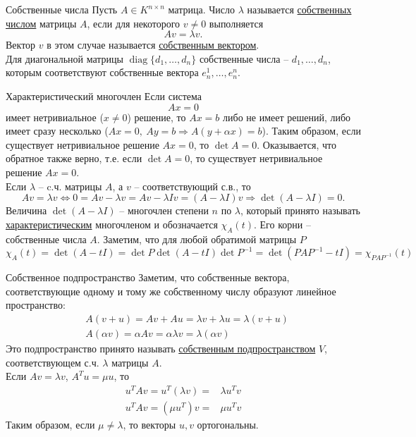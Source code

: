 \documentclass[10pt, handout]{beamer}
\DeclareMathOperator{\diag}{diag}
\begin{document}
\begin{frame}{Собственные числа}
Пусть $A\in K^{n\times n}$ матрица. Число $\lambda$ называется \underline{собственных числом} матрицы $A$, если для некоторого $v\neq 0$ выполняется
$$
Av=\lambda v.
$$
Вектор $v$ в этом случае называется \underline{собственным вектором}.\\
\vspace{1em}
\pause
Для диагональной матрицы $\diag\{d_1,\ldots, d_n\}$ собственные числа -- $d_1,\ldots, d_n$, которым соответствуют собственные вектора $e_n^1, \ldots, e_n^n$.
\end{frame}

\begin{frame}{Характеристический многочлен}
Если система
$$
Ax=0
$$
имеет нетривиальное ($x\neq 0$) решение, то $Ax=b$ либо не имеет решений, либо имеет сразу несколько ($Ax=0,~Ay=b\Rightarrow A(y+\alpha x)=b$). Таким образом, если существует нетривиальное решение $Ax=0$, то $\det A=0$. Оказывается, что обратное также верно, т.е. если $\det A=0$, то существует нетривиальное решение $Ax=0$.\\
\pause
\vspace{1em}
Если $\lambda$ -- c.ч. матрицы $A$, а $v$ -- соответствующий с.в., то
$$
Av=\lambda v\Leftrightarrow 0=Av-\lambda v=Av-\lambda Iv=(A-\lambda I)v\Rightarrow \det (A-\lambda I)=0.
$$
Величина $\det (A-\lambda I)$ -- многочлен степени $n$ по $\lambda$, который принято называть \underline{характеристическим} многочленом и обозначается $\chi_A(t)$. Его корни -- собственные числа $A$. Заметим, что для любой обратимой матрицы $P$
$$
\chi_A(t)=\det(A-tI)=\det P \det(A-tI) \det P^{-1}=
\det(PAP^{-1}-tI)=\chi_{PAP^{-1}}(t)
$$
\end{frame}

\begin{frame}{Собственное подпространство}
Заметим, что собственные вектора, соответствующие одному и тому же собственному числу образуют линейное пространство:
\begin{align*}
&A(v+u)=Av+Au=\lambda v +\lambda u=\lambda(v+u)\\
&A(\alpha v)=\alpha Av=\alpha\lambda v=\lambda(\alpha v)
\end{align*}
Это подпространство принято называть \underline{собственным подпространством} $V$, соответствующем с.ч. $\lambda$ матрицы $A$.\\
\pause
Если $Av=\lambda v$, $A^Tu=\mu u$, то
\begin{align*}
u^TAv=u^T(\lambda v)=&\lambda u^Tv\\
u^TAv=(\mu u^T)v=&\mu u^Tv
\end{align*}
Таким образом, если $\mu\neq \lambda$, то векторы $u, v$ ортогональны.
\end{frame}
\end{document}
